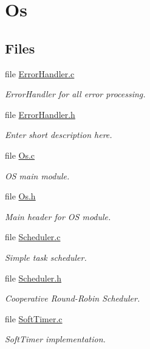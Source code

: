 \hypertarget{group___os}{\section{Os}
\label{group___os}
}
\subsection*{Files}
\begin{DoxyCompactItemize}
\item 
file \hyperlink{_error_handler_8c}{Error\+Handler.\+c}
\begin{DoxyCompactList}\small\item\em Error\+Handler for all error processing. \end{DoxyCompactList}\item 
file \hyperlink{_error_handler_8h}{Error\+Handler.\+h}
\begin{DoxyCompactList}\small\item\em Enter short description here. \end{DoxyCompactList}\item 
file \hyperlink{_os_8c}{Os.\+c}
\begin{DoxyCompactList}\small\item\em O\+S main module. \end{DoxyCompactList}\item 
file \hyperlink{_os_8h}{Os.\+h}
\begin{DoxyCompactList}\small\item\em Main header for O\+S module. \end{DoxyCompactList}\item 
file \hyperlink{_scheduler_8c}{Scheduler.\+c}
\begin{DoxyCompactList}\small\item\em Simple task scheduler. \end{DoxyCompactList}\item 
file \hyperlink{_scheduler_8h}{Scheduler.\+h}
\begin{DoxyCompactList}\small\item\em Cooperative Round-\/\+Robin Scheduler. \end{DoxyCompactList}\item 
file \hyperlink{_soft_timer_8c}{Soft\+Timer.\+c}
\begin{DoxyCompactList}\small\item\em Soft\+Timer implementation. \end{DoxyCompactList}\item 

\end{DoxyCompactItemize}
